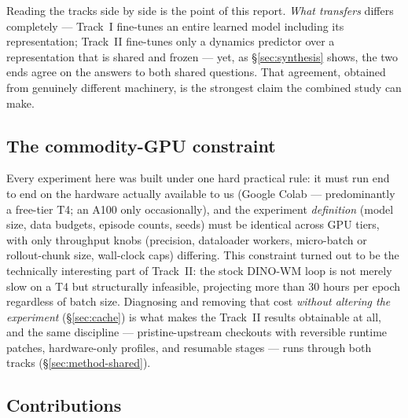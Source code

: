 \documentclass[11pt,a4paper]{article}
\begin{document}
Reading the tracks side by side is the point of this report. \emph{What
transfers} differs completely --- Track~I fine-tunes an entire learned model
including its representation; Track~II fine-tunes only a dynamics predictor over
a representation that is shared and frozen --- yet, as \S\ref{sec:synthesis}
shows, the two ends agree on the answers to both shared questions. That
agreement, obtained from genuinely different machinery, is the strongest claim
the combined study can make.

\subsection{The commodity-GPU constraint}
\label{sec:constraint}

Every experiment here was built under one hard practical rule: it must run end
to end on the hardware actually available to us (Google Colab --- predominantly
a free-tier T4; an A100 only occasionally), and the experiment \emph{definition}
(model size, data budgets, episode counts, seeds) must be identical across GPU
tiers, with only throughput knobs (precision, dataloader workers, micro-batch
or rollout-chunk size, wall-clock caps) differing. This constraint turned out
to be the technically interesting part of Track~II: the stock DINO-WM loop is
not merely slow on a T4 but structurally infeasible, projecting more than
$30$ hours per epoch regardless of batch size. Diagnosing and removing that
cost \emph{without altering the experiment} (\S\ref{sec:cache}) is what makes
the Track~II results obtainable at all, and the same discipline ---
pristine-upstream checkouts with reversible runtime patches, hardware-only
profiles, and resumable stages --- runs through both tracks (\S\ref{sec:method-shared}).

\subsection{Contributions}
\label{sec:contributions}
\end{document}
